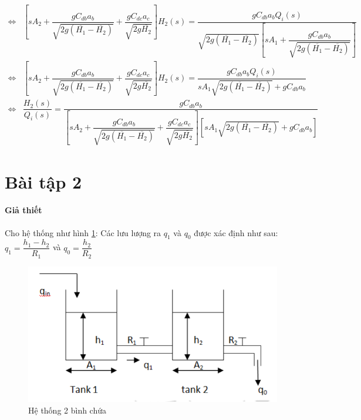\documentclass[12pt,a4paper]{article}
\begin{document}
\begin{enumerate}[\it a.]
\begin{itemize}
\begin{align}
                            \Longleftrightarrow & \left[{s A_2 + \dfrac{g C_{db}a_b}{ \sqrt{2g(\overline{H_1} - \overline{H_2})}} + \dfrac{g C_{dc}a_c}{\sqrt{2g\overline{H_2}}} }\right] H_2 (s) = \dfrac{g C_{db}a_b Q_i(s)}{\sqrt{2g(\overline{H_1} - \overline{H_2})} \left[{s A_1 + \dfrac{gC_{db}a_b}{\sqrt{2g(\overline{H_1} - \overline{H_2})}}}\right]} \\
                            \Longleftrightarrow & \left[{s A_2 + \dfrac{g C_{db}a_b}{ \sqrt{2g(\overline{H_1} - \overline{H_2})}} + \dfrac{g C_{dc}a_c}{\sqrt{2g\overline{H_2}}} }\right] H_2 (s) = \dfrac{g C_{db}a_b Q_i(s)}{s A_1 \sqrt{2g(\overline{H_1} - \overline{H_2})} + gC_{db}a_b} \\
                            \Longleftrightarrow & \dfrac{H_2(s)}{Q_i(s)} = \dfrac{g C_{db}a_b}{\left[{s A_2 + \dfrac{g C_{db}a_b}{ \sqrt{2g(\overline{H_1} - \overline{H_2})}} + \dfrac{g C_{dc}a_c}{\sqrt{2g\overline{H_2}}} }\right]  \left[{ s A_1 \sqrt{2g(\overline{H_1} - \overline{H_2})} + gC_{db}a_b }\right]}
                        \end{align}
                \end{itemize}
        \end{enumerate}


\section{Bài tập 2}
    \paragraph{Giả thiết}
    Cho hệ thống như hình \ref{baitap2}:  Các lưu lượng ra $q_1$ và $q_0$ được xác định như sau: $q_1 = \dfrac{h_1 - h_2}{R_1}$ và $q_0 = \dfrac{h_2}{R_2}$
    \begin{figure}[htp]
        \begin{center}
            \includegraphics[scale=.5]{bai2}
        \end{center}
        \caption{Hệ thống 2 bình chứa} \label{baitap2}
    \end{figure}
\end{document}
